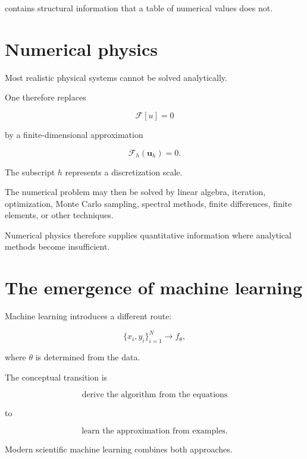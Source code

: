 \documentclass[11pt,a4paper,oneside]{book}
\begin{document}
contains structural information that a table of numerical values does not.

\section{Numerical physics}

Most realistic physical systems cannot be solved analytically.

One therefore replaces

\begin{equation}
\mathcal{F}[u]=0
\end{equation}

by a finite-dimensional approximation

\begin{equation}
\mathcal{F}_h(\mathbf{u}_h)=0.
\end{equation}

The subscript $h$ represents a discretization scale.

The numerical problem may then be solved by linear algebra, iteration,
optimization, Monte Carlo sampling, spectral methods, finite differences,
finite elements, or other techniques.

Numerical physics therefore supplies quantitative information where analytical
methods become insufficient.

\section{The emergence of machine learning}

Machine learning introduces a different route:

\begin{equation}
\{x_i,y_i\}_{i=1}^N
\longrightarrow
f_\theta,
\end{equation}

where $\theta$ is determined from the data.

The conceptual transition is

\begin{equation}
\boxed{
\text{derive the algorithm from the equations}
}
\end{equation}

to

\begin{equation}
\boxed{
\text{learn the approximation from examples}.
}
\end{equation}

Modern scientific machine learning combines both approaches.
\end{document}
